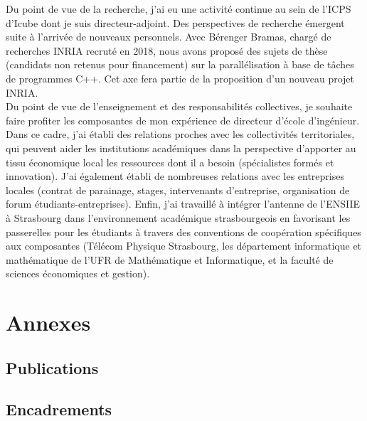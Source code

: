 Du point de vue de la recherche, j'ai eu une activité continue au sein de l'ICPS
d'Icube dont je  suis directeur-adjoint. Des perspectives  de recherche émergent
suite  à l'arrivée  de  nouveaux  personnels. Avec  Bérenger  Bramas, chargé  de
recherches  INRIA recruté  en  2018,  nous avons  proposé  des  sujets de  thèse
(candidats non retenus pour financement) sur la parallélisation à base de tâches
de programmes  C++. Cet axe  fera partie de  la proposition d'un  nouveau projet
INRIA.\\

Du  point  de vue  de  l'enseignement  et  des responsabilités  collectives,  je
souhaite faire profiter  les composantes de mon expérience  de directeur d'école
d'ingénieur.   Dans  ce  cadre,  j'ai  établi des  relations  proches  avec  les
collectivités territoriales, qui peuvent aider les institutions académiques dans
la perspective  d'apporter au tissu  économique local  les ressources dont  il a
besoin (spécialistes formés et innovation).  J'ai également établi de nombreuses
relations  avec   les  entreprises   locales  (contrat  de   parainage,  stages,
intervenants d'entreprise, organisation  de forum étudiants-entreprises). Enfin,
j'ai   travaillé  à   intégrer   l'antenne  de   l'ENSIIE   à  Strasbourg   dans
l'environnement académique strasbourgeois en favorisant les passerelles pour les
étudiants à travers  des conventions de coopération  spécifiques aux composantes
(Télécom Physique  Strasbourg, les  département informatique et  mathématique de
l'UFR de Mathématique et Informatique, et  la faculté de sciences économiques et
gestion).

\section{Annexes}
\subsection{Publications}


\subsection{Encadrements}


%

